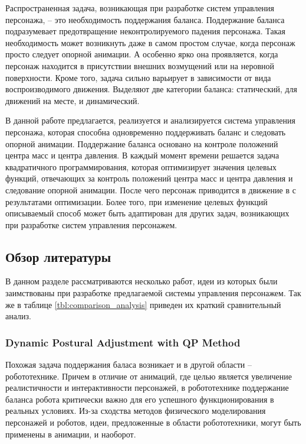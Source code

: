 Распространенная задача, возникающая при разработке систем управления персонажа, -- это необходимость поддержания баланса. Поддержание баланса подразумевает предотвращение неконтролируемого падения персонажа. Такая необходимость может возникнуть даже в самом простом случае, когда персонаж просто следует опорной анимации. А особенно ярко она проявляется, когда персонаж находится в присутствии внешних возмущений или на неровной поверхности. Кроме того, задача сильно варьирует в зависимости от вида воспроизводимого движения. Выделяют две категории баланса: статический, для движений на месте, и динамический.

В данной работе предлагается, реализуется и анализируется система управления персонажа, которая способна одновременно поддерживать баланс и следовать опорной анимации. Поддержание баланса основано на контроле положений центра масс и центра давления. В каждый момент времени решается задача квадратичного программирования, которая оптимизирует значения целевых функций, отвечающих за контроль положений центра масс и центра давления и следование опорной анимации. После чего персонаж приводится в движение в  с результатами оптимизации. Более того, при изменение целевых функций описываемый способ может быть адаптирован для других задач, возникающих при разработке систем управления персонажем.

\subsection{Обзор литературы}

В данном разделе рассматриваются несколько работ, идеи из которых были заимствованы при разработке предлагаемой системы управления персонажем. Так же в таблице \ref{tbl:comparison_analysis} приведен их краткий сравнительный анализ.

\subsubsection{Dynamic Postural Adjustment with QP Method}

Похожая задача поддержания баласа возникает и в другой области -- робототехнике. Причем в отличие от анимаций, где целью является увеличение реалистичности и интерактивности персонажей, в робототехнике поддержание баланса робота критически важно для его успешного функционирования в реальных условиях. Из-за сходства методов физического моделирования персонажей и роботов, идеи, предложенные в области робототехники, могут быть применены в анимации, и наоборот.

